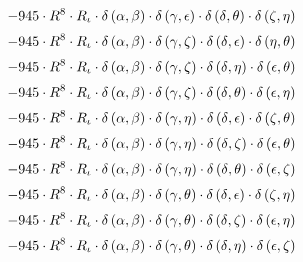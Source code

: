 \begin{subequations}
\begin{gather}
 \\[0.2em] \notag 		 - 945 \cdot R^{8} \cdot R_{\iota{}} \cdot \delta{}\left(\alpha{}, \beta{}\right) \cdot \delta{}\left(\gamma{}, \epsilon{}\right) \cdot \delta{}\left(\delta{}, \theta{}\right) \cdot \delta{}\left(\zeta{}, \eta{}\right) 
 \\[0.2em] \notag 		 - 945 \cdot R^{8} \cdot R_{\iota{}} \cdot \delta{}\left(\alpha{}, \beta{}\right) \cdot \delta{}\left(\gamma{}, \zeta{}\right) \cdot \delta{}\left(\delta{}, \epsilon{}\right) \cdot \delta{}\left(\eta{}, \theta{}\right) 
 \\[0.2em] \notag 		 - 945 \cdot R^{8} \cdot R_{\iota{}} \cdot \delta{}\left(\alpha{}, \beta{}\right) \cdot \delta{}\left(\gamma{}, \zeta{}\right) \cdot \delta{}\left(\delta{}, \eta{}\right) \cdot \delta{}\left(\epsilon{}, \theta{}\right) 
 \\[0.2em] \notag 		 - 945 \cdot R^{8} \cdot R_{\iota{}} \cdot \delta{}\left(\alpha{}, \beta{}\right) \cdot \delta{}\left(\gamma{}, \zeta{}\right) \cdot \delta{}\left(\delta{}, \theta{}\right) \cdot \delta{}\left(\epsilon{}, \eta{}\right) 
 \\[0.2em] \notag 		 - 945 \cdot R^{8} \cdot R_{\iota{}} \cdot \delta{}\left(\alpha{}, \beta{}\right) \cdot \delta{}\left(\gamma{}, \eta{}\right) \cdot \delta{}\left(\delta{}, \epsilon{}\right) \cdot \delta{}\left(\zeta{}, \theta{}\right) 
 \\[0.2em] \notag 		 - 945 \cdot R^{8} \cdot R_{\iota{}} \cdot \delta{}\left(\alpha{}, \beta{}\right) \cdot \delta{}\left(\gamma{}, \eta{}\right) \cdot \delta{}\left(\delta{}, \zeta{}\right) \cdot \delta{}\left(\epsilon{}, \theta{}\right) 
 \\[0.2em] \notag 		 - 945 \cdot R^{8} \cdot R_{\iota{}} \cdot \delta{}\left(\alpha{}, \beta{}\right) \cdot \delta{}\left(\gamma{}, \eta{}\right) \cdot \delta{}\left(\delta{}, \theta{}\right) \cdot \delta{}\left(\epsilon{}, \zeta{}\right) 
 \\[0.2em] \notag 		 - 945 \cdot R^{8} \cdot R_{\iota{}} \cdot \delta{}\left(\alpha{}, \beta{}\right) \cdot \delta{}\left(\gamma{}, \theta{}\right) \cdot \delta{}\left(\delta{}, \epsilon{}\right) \cdot \delta{}\left(\zeta{}, \eta{}\right) 
 \\[0.2em] \notag 		 - 945 \cdot R^{8} \cdot R_{\iota{}} \cdot \delta{}\left(\alpha{}, \beta{}\right) \cdot \delta{}\left(\gamma{}, \theta{}\right) \cdot \delta{}\left(\delta{}, \zeta{}\right) \cdot \delta{}\left(\epsilon{}, \eta{}\right) 
 \\[0.2em] \notag 		 - 945 \cdot R^{8} \cdot R_{\iota{}} \cdot \delta{}\left(\alpha{}, \beta{}\right) \cdot \delta{}\left(\gamma{}, \theta{}\right) \cdot \delta{}\left(\delta{}, \eta{}\right) \cdot \delta{}\left(\epsilon{}, \zeta{}\right) 

\end{gather}
\end{subequations}
